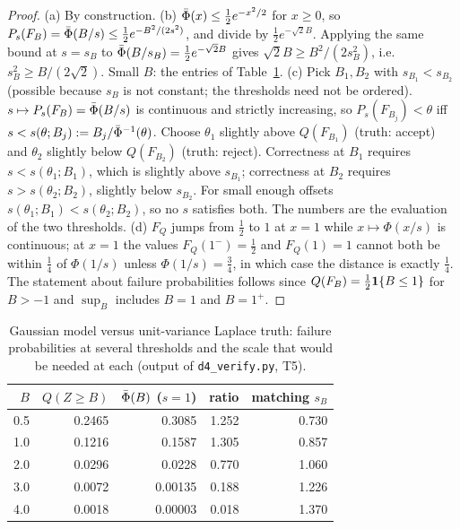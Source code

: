\begin{proof}
(a) By construction. (b) $\bar\Phi(x)\le\tfrac12e^{-x^2/2}$ for $x\ge0$, so $P_s(F_B)=\bar\Phi(B/s)\le\tfrac12e^{-B^2/(2s^2)}$, and divide by $\tfrac12e^{-\sqrt2B}$. Applying the same bound at $s=s_B$ to $\bar\Phi(B/s_B)=\tfrac12e^{-\sqrt2B}$ gives $\sqrt2B\ge B^2/(2s_B^2)$, i.e.\ $s_B^2\ge B/(2\sqrt2)$. Small $B$: the entries of Table~\ref{tab:t5}.
(c) Pick $B_1,B_2$ with $s_{B_1}<s_{B_2}$ (possible because $s_B$ is not constant; the thresholds need not be ordered). $s\mapsto P_s(F_B)=\bar\Phi(B/s)$ is continuous and strictly increasing, so $P_s(F_{B_j})<\theta$ iff $s<s(\theta;B_j):=B_j/\bar\Phi^{-1}(\theta)$. Choose $\theta_1$ slightly above $Q(F_{B_1})$ (truth: accept) and $\theta_2$ slightly below $Q(F_{B_2})$ (truth: reject). Correctness at $B_1$ requires $s<s(\theta_1;B_1)$, which is slightly above $s_{B_1}$; correctness at $B_2$ requires $s>s(\theta_2;B_2)$, slightly below $s_{B_2}$. For small enough offsets $s(\theta_1;B_1)<s(\theta_2;B_2)$, so no $s$ satisfies both. The numbers are the evaluation of the two thresholds.
(d) $F_Q$ jumps from $\tfrac12$ to $1$ at $x=1$ while $x\mapsto\Phi(x/s)$ is continuous; at $x=1$ the values $F_Q(1^-)=\tfrac12$ and $F_Q(1)=1$ cannot both be within $\tfrac14$ of $\Phi(1/s)$ unless $\Phi(1/s)=\tfrac34$, in which case the distance is exactly $\tfrac14$.
The statement about failure probabilities follows since $Q(F_B)=\tfrac12\mathbf 1\{B\le1\}$ for $B>-1$ and $\sup_B$ includes $B=1$ and $B=1^+$.
\end{proof}

\begin{table}[h]
\centering\small
\begin{tabular}{rrrrr}
\hline
$B$ & $Q(Z\ge B)$ & $\bar\Phi(B)$ ($s=1$) & ratio & matching $s_B$\\
\hline
0.5 & 0.2465 & 0.3085 & 1.252 & 0.730\\
1.0 & 0.1216 & 0.1587 & 1.305 & 0.857\\
2.0 & 0.0296 & 0.0228 & 0.770 & 1.060\\
3.0 & 0.0072 & 0.00135 & 0.188 & 1.226\\
4.0 & 0.0018 & 0.00003 & 0.018 & 1.370\\
\hline
\end{tabular}
\caption{Gaussian model versus unit-variance Laplace truth: failure probabilities at several thresholds and the scale that would be needed at each (output of \texttt{d4\_verify.py}, T5).}
\label{tab:t5}
\end{table}

